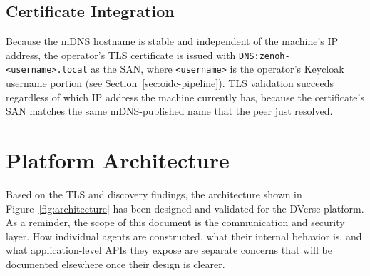\documentclass[11pt,a4paper]{article}
\begin{document}
\subsection{Certificate Integration}

Because the mDNS hostname is stable and independent of the
machine's IP address, the operator's TLS certificate is issued with
\texttt{DNS:zenoh-<username>.local} as the SAN, where
\texttt{<username>} is the operator's Keycloak username portion
(see Section~\ref{sec:oidc-pipeline}). TLS validation succeeds regardless
of which IP address the machine currently has, because the
certificate's SAN matches the same mDNS-published name that the
peer just resolved.

\section{Platform Architecture}

Based on the TLS and discovery findings, the architecture shown in
Figure~\ref{fig:architecture} has been designed and validated for the
DVerse platform. As a reminder, the scope of this document is the
communication and security layer. How individual agents are
constructed, what their internal behavior is, and what
application-level APIs they expose are separate concerns that will be
documented elsewhere once their design is clearer.
\end{document}
